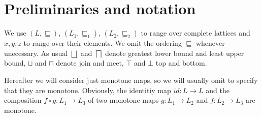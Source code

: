 \documentclass{llncs}
\begin{document}
%
%
%
%


\section{Preliminaries and notation}
%
We use $(L,\sqsubseteq)$, $(L_1,\sqsubseteq_1)$, $(L_2,\sqsubseteq_2)$ to range over complete lattices and $x,y,z$ to range over their elements. We omit the ordering $\sqsubseteq$ whenever unecessary. As usual $\bigsqcup$ and $\bigsqcap$ denote greatest lower bound and least upper bound, $\sqcup$ and $\sqcap$ denote join and meet, $\top$ and $\bot$ top and bottom.

Hereafter we will consider just monotone maps, so we will usually omit to specify that they are monotone. Obviously, the identitiy map $id\colon L\to L$ and the composition $f\circ g \colon L_1\to L_3$ of two monotone maps $g\colon L_1\to L_2$ and  $f\colon L_2\to L_3$  are monotone. 
\end{document}
